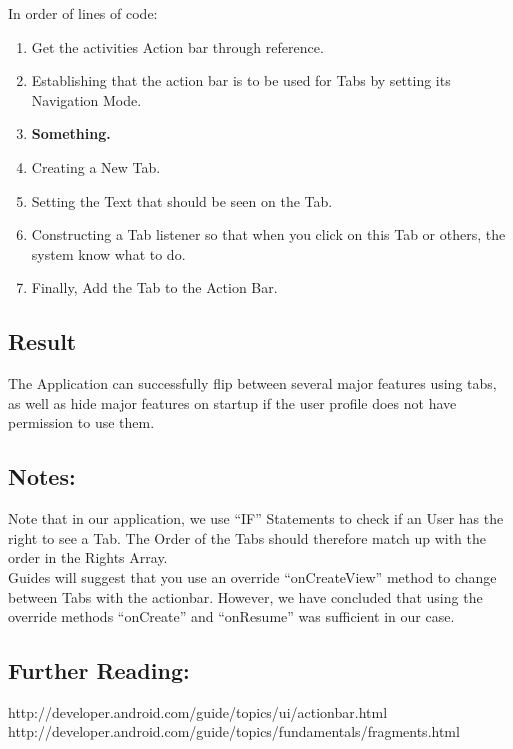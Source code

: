\noindent In order of lines of code:
\begin{enumerate}
\item Get the activities Action bar through reference.
\item Establishing that the action bar is to be used for Tabs by setting its Navigation Mode.
\item \textbf{Something.}
\item Creating a New Tab.
\item Setting the Text that should be seen on the Tab.
\item Constructing a Tab listener so that when you click on this Tab or others, the system know what to do.
\item Finally, Add the Tab to the Action Bar.
\end{enumerate}

\subsection*{Result}
The Application can successfully flip between several major features using tabs, as well as hide major features on startup if the user profile does not have permission to use them.

\subsection*{Notes:}
Note that in our application, we use ``IF'' Statements to check if an User has the right to see a Tab.
The Order of the Tabs should therefore match up with the order in the Rights Array.\\
Guides will suggest that you use an override ``onCreateView'' method to change between Tabs with the actionbar.
However, we have concluded that using the override methods ``onCreate'' and ``onResume'' was sufficient in our case.

\subsection*{Further Reading:}
http://developer.android.com/guide/topics/ui/actionbar.html \\
http://developer.android.com/guide/topics/fundamentals/fragments.html

